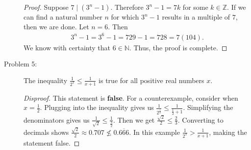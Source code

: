 \documentclass[12pt]{article}
\begin{document}
\begin{description}
\begin{spacing}{2}
\begin{proof}
Suppose $7 \mid (3^n - 1)$. Therefore $3^n -1 = 7k$ for some $k \in \mathbb{Z}$. If we can find a natural number $n$ for which $3^n -1$ results in a multiple of $7$, then we are done. 
\newline
Let $n = 6$.  Then
\begin{align*}
3^n - 1 = 3^6 -1 = 729 - 1 = 728 = 7(104).
\end{align*}
We know with certainty that $6 \in \mathbb{N}$. Thus, the proof is complete.
\end{proof}
\end{spacing} 
\item[Problem 5:] The inequality $\frac{1}{2^x} \leq \frac{1}{x+1}$ is true for all positive real numbers $x$.
\begin{spacing}{2}
\begin{proof}[Disproof]
This statement is \textbf{false}. For a counterexample, consider when $x = \frac{1}{2}$. Plugging into the inequality gives us  $\frac{1}{2^\frac{1}{2}} \leq \frac{1}{\frac{1}{2}+1}$. Simplifying the denominators gives us $\frac{1}{\sqrt{2}} \leq \frac{1}{\frac{3}{2}}$. Then we get $\frac{\sqrt{2}}{2} \leq \frac{2}{3}$. Converting to decimals shows $\frac{\sqrt{2}}{2} \approx 0.707 \not \leq 0.\overline{666}$. In this example $\frac{1}{2^x} > \frac{1}{x+1}$, making the statement false.
\end{proof}
\end{spacing} 
\end{description}
%
\newpage
{}
%
\end{document}
